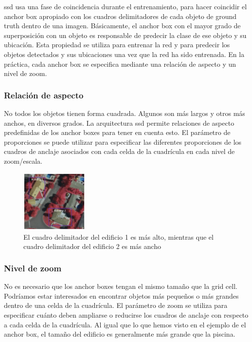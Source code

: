 \gls{ssd} usa una fase de coincidencia durante el entrenamiento, para hacer coincidir el anchor box apropiado con los cuadros delimitadores de cada objeto de ground truth dentro de una imagen. Básicamente, el anchor box con el mayor grado de superposición con un objeto es responsable de predecir la clase de ese objeto y su ubicación. Esta propiedad se utiliza para entrenar la red y para predecir los objetos detectados y sus ubicaciones una vez que la red ha sido entrenada. En la práctica, cada anchor box se especifica mediante una relación de aspecto y un nivel de zoom.

\subsubsection*{Relación de aspecto}
\label{subsubsec:aspect-ratio-ssd}

No todos los objetos tienen forma cuadrada. Algunos son más largos y otros más anchos, en diversos grados. La arquitectura \gls{ssd} permite relaciones de aspecto predefinidas de los anchor boxes para tener en cuenta esto. El parámetro de proporciones se puede utilizar para especificar las diferentes proporciones de los cuadros de anclaje asociados con cada celda de la cuadrícula en cada nivel de zoom/escala.

\begin{figure}[ht]
\centering
\includegraphics[width=0.30\textwidth]{img/chapters/estado-del-arte/aspect_ratio-ejemplo-ssd.png}
\caption{\label{fig:aspect_ratio-ejemplo-ssd}El cuadro delimitador del edificio 1 es más alto, mientras que el cuadro delimitador del edificio 2 es más ancho \cite{how-works-ssd}}
\end{figure}

\subsubsection*{Nivel de zoom}
\label{subsubsec:zoom-level-ssd}

No es necesario que los anchor boxes tengan el mismo tamaño que la grid cell. Podríamos estar interesados en encontrar objetos más pequeños o más grandes dentro de una celda de la cuadrícula. El parámetro de zoom se utiliza para especificar cuánto deben ampliarse o reducirse los cuadros de anclaje con respecto a cada celda de la cuadrícula. Al igual que lo que hemos visto en el ejemplo de el anchor box, el tamaño del edificio es generalmente más grande que la piscina.

